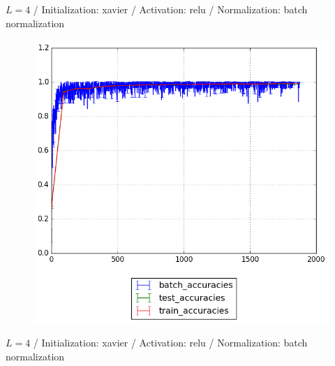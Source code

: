 \documentclass{beamer}
\begin{document}
{	%
	\begin{frame}[t]{}{}%
		\vfill
		\begin{center}
			{$L = 4$ / Initialization: xavier / Activation: relu / Normalization: batch normalization}
		\end{center}
    		\begin{figure}
    			\centering
    			\includegraphics[scale=0.4]{gfx/l4b32_relu_xavier_batch_normalization_cnn_accuracies}
    		\end{figure}
    		\vfill
	\end{frame}
	\begin{frame}[t]{}{}%
		\vfill
		\begin{center}
			{$L = 4$ / Initialization: xavier / Activation: relu / Normalization: batch normalization}
		\end{center}
    		\begin{figure}
    			\centering

\end{figure}
\end{frame}}
\end{document}
